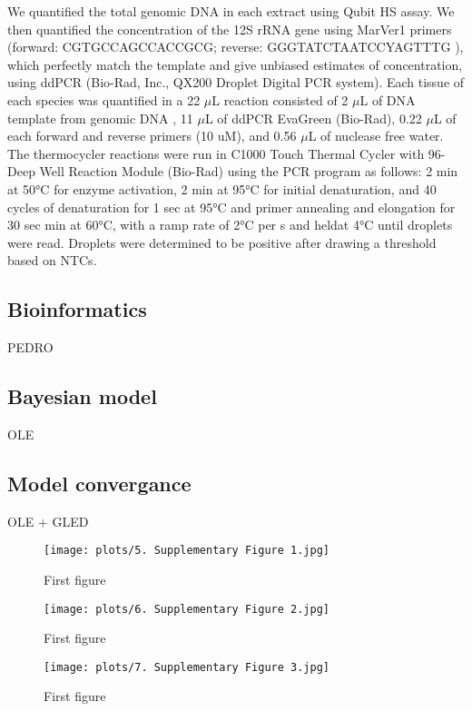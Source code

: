 \documentclass[9pt,twoside,lineno]{pnas-new}
\begin{document}
We quantified the total genomic DNA in each extract using Qubit HS assay. We then quantified the concentration of the 12S rRNA gene using MarVer1 primers (forward: CGTGCCAGCCACCGCG; reverse: GGGTATCTAATCCYAGTTTG \cite{valsecchi2020}), which perfectly match the template and give unbiased estimates of concentration, using ddPCR (Bio-Rad, Inc., QX200 Droplet Digital PCR system). Each tissue of each species was quantified in a 22 $\mu$L reaction consisted of 2 $\mu$L of DNA template from genomic DNA , 11 $\mu$L of ddPCR EvaGreen (Bio-Rad), 0.22 $\mu$L of each forward and reverse primers (10 uM), and 0.56 $\mu$L of nuclease free water. The thermocycler reactions were run in C1000 Touch Thermal Cycler with 96-Deep Well Reaction Module (Bio-Rad) using the PCR program as follows: 2 min at 50°C for enzyme activation, 2 min at 95°C for initial denaturation, and 40 cycles of denaturation for 1 sec at 95°C and primer annealing and elongation for 30 sec min at 60°C, with a ramp rate of 2°C per s and heldat 4°C until droplets were read. Droplets were determined to be positive after drawing a threshold based on NTCs.

\subsection*{Bioinformatics}
PEDRO

\subsection*{Bayesian model}
OLE

\subsection*{Model convergance}
OLE + GLED


\begin{figure}
\centering
\texttt{[image: plots/5. Supplementary Figure 1.jpg]}
\caption{First figure}
\end{figure}

\begin{figure}
\centering
\texttt{[image: plots/6. Supplementary Figure 2.jpg]}
\caption{First figure}
\end{figure}

\begin{figure}
\centering
\texttt{[image: plots/7. Supplementary Figure 3.jpg]}
\caption{First figure}
\end{figure}
\end{document}
